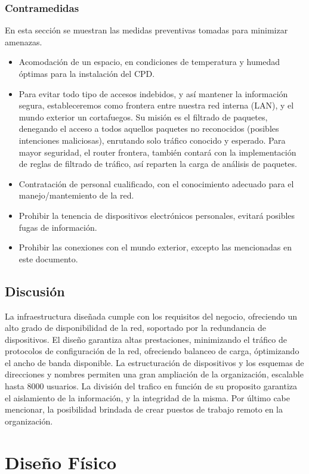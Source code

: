 \documentclass[a4paper,onecolumn,11pt]{article}
\begin{document}
\subsubsection{Contramedidas}
En esta sección se muestran las medidas preventivas tomadas para minimizar amenazas.
\begin{itemize}
\item Acomodación de un espacio, en condiciones de temperatura y humedad óptimas para la instalación del CPD.
\item Para evitar todo tipo de accesos indebidos, y así mantener la información segura, estableceremos como frontera entre nuestra red interna (LAN), y el mundo exterior un cortafuegos. Su misión es el filtrado de paquetes, denegando el acceso a todos aquellos paquetes no reconocidos (posibles intenciones maliciosas), enrutando solo tráfico conocido y esperado.
Para mayor seguridad, el router frontera, también contará con la implementación de reglas de filtrado de tráfico, así reparten la carga de análisis de paquetes.
\item Contratación de personal cualificado, con el conocimiento adecuado para el manejo/mantemiento de la red.
\item Prohibir la tenencia de dispositivos electrónicos personales, evitará posibles fugas de información.
\item Prohibir las conexiones con el mundo exterior, excepto las mencionadas en este documento.
\end{itemize}
\subsection{Discusión}

La infraestructura diseñada cumple con los requisitos del negocio, ofreciendo un alto grado de disponibilidad de la red, soportado por la redundancia de dispositivos. El diseño garantiza altas prestaciones, minimizando el tráfico de protocolos de configuración de la red, ofreciendo balanceo de carga, óptimizando el ancho de banda disponible. La estructuración de dispositivos y los esquemas de direcciones y nombres permiten una gran ampliación de la organización, escalable hasta 8000 usuarios. La división del trafico en función de su proposito garantiza el aislamiento de la información, y la integridad de la misma. Por último cabe mencionar, la posibilidad brindada de crear puestos de trabajo remoto en la organización.

\section{Diseño Físico}
\end{document}
